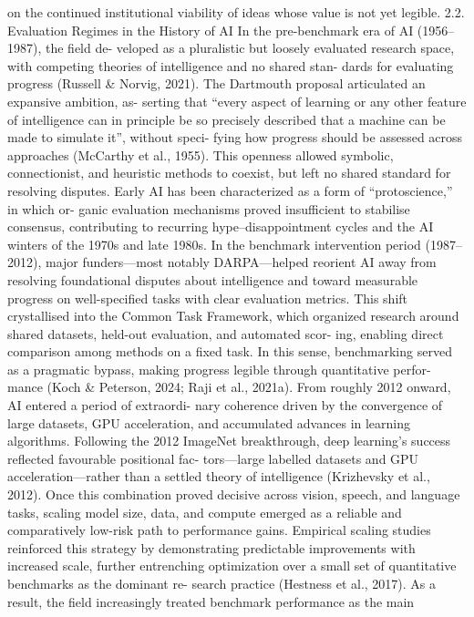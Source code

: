 on the continued institutional viability of ideas whose value
is not yet legible.
2.2. Evaluation Regimes in the History of AI
In the pre-benchmark era of AI (1956–1987), the field de-
veloped as a pluralistic but loosely evaluated research space,
with competing theories of intelligence and no shared stan-
dards for evaluating progress (Russell \& Norvig, 2021). The
Dartmouth proposal articulated an expansive ambition, as-
serting that “every aspect of learning or any other feature
of intelligence can in principle be so precisely described
that a machine can be made to simulate it”, without speci-
fying how progress should be assessed across approaches
(McCarthy et al., 1955). This openness allowed symbolic,
connectionist, and heuristic methods to coexist, but left
no shared standard for resolving disputes. Early AI has
been characterized as a form of “protoscience,” in which or-
ganic evaluation mechanisms proved insufficient to stabilise
consensus, contributing to recurring hype–disappointment
cycles and the AI winters of the 1970s and late 1980s.
In the benchmark intervention period (1987–2012), major
funders—most notably DARPA—helped reorient AI away
from resolving foundational disputes about intelligence and
toward measurable progress on well-specified tasks with
clear evaluation metrics. This shift crystallised into the
Common Task Framework, which organized research around
shared datasets, held-out evaluation, and automated scor-
ing, enabling direct comparison among methods on a fixed
task. In this sense, benchmarking served as a pragmatic
bypass, making progress legible through quantitative perfor-
mance (Koch \& Peterson, 2024; Raji et al., 2021a).
From roughly 2012 onward, AI entered a period of extraordi-
nary coherence driven by the convergence of large datasets,
GPU acceleration, and accumulated advances in learning
algorithms. Following the 2012 ImageNet breakthrough,
deep learning’s success reflected favourable positional fac-
tors—large labelled datasets and GPU acceleration—rather
than a settled theory of intelligence (Krizhevsky et al., 2012).
Once this combination proved decisive across vision, speech,
and language tasks, scaling model size, data, and compute
emerged as a reliable and comparatively low-risk path to
performance gains. Empirical scaling studies reinforced
this strategy by demonstrating predictable improvements
with increased scale, further entrenching optimization over
a small set of quantitative benchmarks as the dominant re-
search practice (Hestness et al., 2017). As a result, the field
increasingly treated benchmark performance as the main
